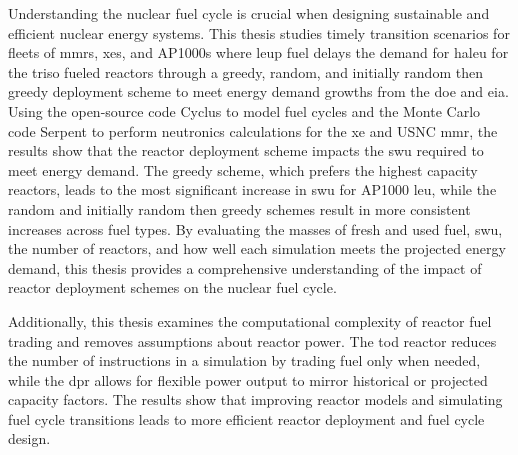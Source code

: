 

Understanding the nuclear fuel cycle is crucial when designing sustainable and efficient nuclear energy systems. This thesis studies timely transition scenarios for fleets of \glspl{mmr}, \glspl{xe}, and AP1000s where \gls{leup} fuel delays the demand for \gls{haleu} for the \gls{triso} fueled reactors through a greedy, random, and initially random then greedy deployment scheme to meet energy demand growths from the \gls{doe} and \gls{eia}. Using the open-source code Cyclus to model fuel cycles and the Monte Carlo code Serpent to perform neutronics calculations for the \gls{xe} and USNC \gls{mmr}, the results show that the reactor deployment scheme impacts the \gls{swu} required to meet energy demand. The greedy scheme, which prefers the highest capacity reactors, leads to the most significant increase in \gls{swu} for AP1000 \gls{leu}, while the random and initially random then greedy schemes result in more consistent increases across fuel types. By evaluating the masses of fresh and used fuel, \gls{swu}, the number of reactors, and how well each simulation meets the projected energy demand, this thesis provides a comprehensive understanding of the impact of reactor deployment schemes on the nuclear fuel cycle.

Additionally, this thesis examines the computational complexity of reactor fuel trading and removes assumptions about reactor power. The \gls{tod} reactor reduces the number of instructions in a simulation by trading fuel only when needed, while the \gls{dpr} allows for flexible power output to mirror historical or projected capacity factors. The results show that improving reactor models and simulating fuel cycle transitions leads to more efficient reactor deployment and fuel cycle design.



